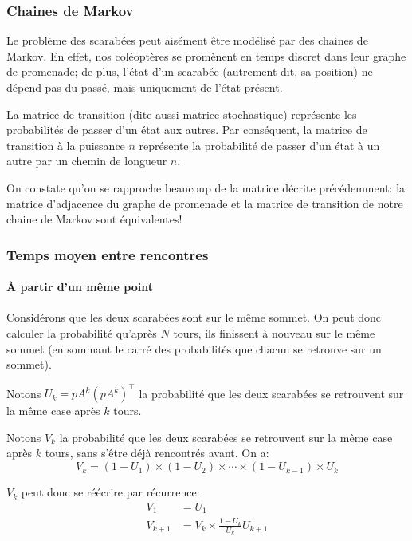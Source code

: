   \subsubsection{Chaines de Markov}
    Le problème des scarabées peut aisément être modélisé par des chaines de
    Markov. En effet, nos coléoptères se promènent en temps discret dans leur
    graphe de promenade; de plus, l'état d'un scarabée (autrement dit, sa
    position) ne dépend pas du passé, mais uniquement de l'état présent.

    La matrice de transition (dite aussi matrice stochastique) représente les
    probabilités de passer d'un état aux autres. Par conséquent, la matrice de
    transition à la puissance $n$ représente la probabilité de passer d'un état
    à un autre par un chemin de longueur $n$.

    On constate qu'on se rapproche beaucoup de la matrice décrite précédemment:
    la matrice d'adjacence du graphe de promenade et la matrice de transition
    de notre chaine de Markov sont équivalentes!

  \subsubsection{Temps moyen entre rencontres}
    \paragraph{À partir d'un même point}
      Considérons que les deux scarabées sont sur le même sommet. On peut donc
      calculer la probabilité qu'après $N$ tours, ils finissent à nouveau sur
      le même sommet (en sommant le carré des probabilités que chacun se retrouve
      sur un sommet).

      Notons $U_k = pA^k(pA^k)^\intercal$ la probabilité que les deux scarabées
      se retrouvent sur la même case après $k$ tours.

      Notons $V_k$ la probabilité que les deux scarabées se retrouvent sur la
      même case après $k$ tours, sans s'être déjà rencontrés avant. On a:
        \[V_k = (1 - U_1) \times (1 - U_2) \times \cdots \times (1 - U_{k - 1})
        \times U_k\]

      $V_k$ peut donc se réécrire par récurrence:
        \begin{align*}
          V_1       &= U_1 \\
          V_{k + 1} &= V_k \times \frac{1 - U_k}{U_k}U_{k + 1}
        \end{align*}

